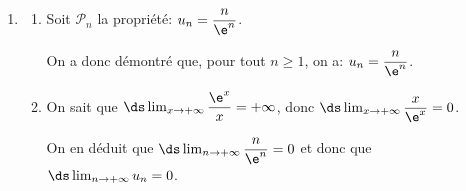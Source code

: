 \begin{enumerate}
\begin{enumerate}
Or pour tout $n$, $u_n>0$, donc:
$\dfrac{1}{\e} \left (1+\dfrac{1}{n}\right ) u_n\leqslant u_n$
c'est-à-dire $u_{n+1}\leqslant u_n$.

La suite $\left(u_{n}\right)$ est décroissante.
		
		\item %
Pour tout $n$, $u_n>0$ donc la suite $(u_n)$ est minorée par 0.

On a démontré que cette suite était décroissante donc, d'après le théorème de la convergence monotone, la suite $(u_n)$ est convergente.		
		\end{enumerate}

	\item \begin{enumerate}
		\item Soit $\mathcal{P}_n$ la propriété: $u_{n}=\dfrac{n}{\e^{n}}$.
		
		
On a donc démontré que, pour tout $n\geqslant 1$, on a: $u_{n}=\dfrac{n}{\e^{n}}$.

		\item %
On sait que
$\ds\lim _{x\to +\infty} \dfrac{\e^{x}}{x}=+\infty$,
donc		
$\ds\lim _{x\to +\infty} \dfrac{x}{\e^{x}}=0$.

On en déduit que
$\ds\lim _{n\to +\infty} \dfrac{n}{\e^{n}}=0$
et donc que
$\ds\lim _{n\to +\infty} u_n=0$.

	\end{enumerate}
\end{enumerate}

\bigskip

